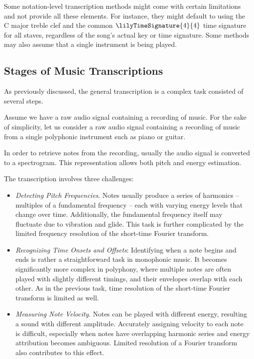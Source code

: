 Some notation-level transcription methods might come with certain limitations and not provide all these elements. For instance, they might default to using the $\textrm{C}$ major treble clef and the common $\lilyTimeSignature{4}{4}$ time signature for all staves, regardless of the song's actual key or time signature. Some methods may also assume that a single instrument is being played.

\subsection{Stages of Music Transcriptions}

As previously discussed, the general transcription is a complex task consisted of several steps.

Assume we have a raw audio signal containing a recording of music. For the sake of simplicity, let us consider a raw audio signal containing a recording of music from a single polyphonic instrument such as piano or guitar.

In order to retrieve notes from the recording, usually the audio signal is converted to a spectrogram. This representation allows both pitch and energy estimation.

The transcription involves three challenges:
\begin{itemize}
	\item \emph{Detecting Pitch Frequencies}. Notes usually produce a series of harmonics – multiples of a fundamental frequency – each with varying energy levels that change over time. Additionally, the fundamental frequency itself may fluctuate due to vibration and glide. This task is further complicated by the limited frequency resolution of the short-time Fourier transform.
	\item \emph{Recognizing Time Onsets and Offsets}: Identifying when a note begins and ends is rather a straightforward task in monophonic music. It becomes significantly more complex in polyphony, where multiple notes are often played with slightly different timings, and their envelopes overlap with each other. As in the previous task, time resolution of the short-time Fourier transform is limited as well.
	\item \emph{Measuring Note Velocity}. Notes can be played with different energy, resulting a sound with different amplitude. Accurately assigning velocity to each note is difficult, especially when notes have overlapping harmonic series and energy attribution becomes ambiguous. Limited resolution of a Fourier transform also contributes to this effect.
\end{itemize}

